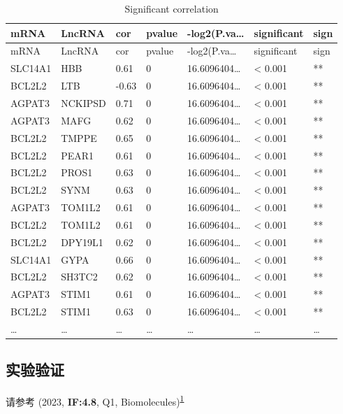 \documentclass[
]{article}
\begin{document}
\begin{longtable}[]{@{}lllllll@{}}
\caption{\label{tab:Significant-correlation}Significant correlation}\tabularnewline
\toprule
mRNA & LncRNA & cor & pvalue & -log2(P.va\ldots{} & significant & sign\tabularnewline
\midrule
\endfirsthead
\toprule
mRNA & LncRNA & cor & pvalue & -log2(P.va\ldots{} & significant & sign\tabularnewline
\midrule
\endhead
SLC14A1 & HBB & 0.61 & 0 & 16.6096404\ldots{} & \textless{} 0.001 & **\tabularnewline
BCL2L2 & LTB & -0.63 & 0 & 16.6096404\ldots{} & \textless{} 0.001 & **\tabularnewline
AGPAT3 & NCKIPSD & 0.71 & 0 & 16.6096404\ldots{} & \textless{} 0.001 & **\tabularnewline
AGPAT3 & MAFG & 0.62 & 0 & 16.6096404\ldots{} & \textless{} 0.001 & **\tabularnewline
BCL2L2 & TMPPE & 0.65 & 0 & 16.6096404\ldots{} & \textless{} 0.001 & **\tabularnewline
BCL2L2 & PEAR1 & 0.61 & 0 & 16.6096404\ldots{} & \textless{} 0.001 & **\tabularnewline
BCL2L2 & PROS1 & 0.63 & 0 & 16.6096404\ldots{} & \textless{} 0.001 & **\tabularnewline
BCL2L2 & SYNM & 0.63 & 0 & 16.6096404\ldots{} & \textless{} 0.001 & **\tabularnewline
AGPAT3 & TOM1L2 & 0.61 & 0 & 16.6096404\ldots{} & \textless{} 0.001 & **\tabularnewline
BCL2L2 & TOM1L2 & 0.61 & 0 & 16.6096404\ldots{} & \textless{} 0.001 & **\tabularnewline
BCL2L2 & DPY19L1 & 0.62 & 0 & 16.6096404\ldots{} & \textless{} 0.001 & **\tabularnewline
SLC14A1 & GYPA & 0.66 & 0 & 16.6096404\ldots{} & \textless{} 0.001 & **\tabularnewline
BCL2L2 & SH3TC2 & 0.62 & 0 & 16.6096404\ldots{} & \textless{} 0.001 & **\tabularnewline
AGPAT3 & STIM1 & 0.61 & 0 & 16.6096404\ldots{} & \textless{} 0.001 & **\tabularnewline
BCL2L2 & STIM1 & 0.63 & 0 & 16.6096404\ldots{} & \textless{} 0.001 & **\tabularnewline
\ldots{} & \ldots{} & \ldots{} & \ldots{} & \ldots{} & \ldots{} & \ldots{}\tabularnewline
\bottomrule
\end{longtable}

\begin{center}\vspace{1.5cm}\end{center}

\hypertarget{ux5b9eux9a8cux9a8cux8bc1}{%
\subsection{实验验证}\label{ux5b9eux9a8cux9a8cux8bc1}}

请参考 (2023, \textbf{IF:4.8}, Q1, Biomolecules)\textsuperscript{\protect\hyperlink{ref-HCC_RNA_Sequen_Wang_2023}{1}}
\end{document}
